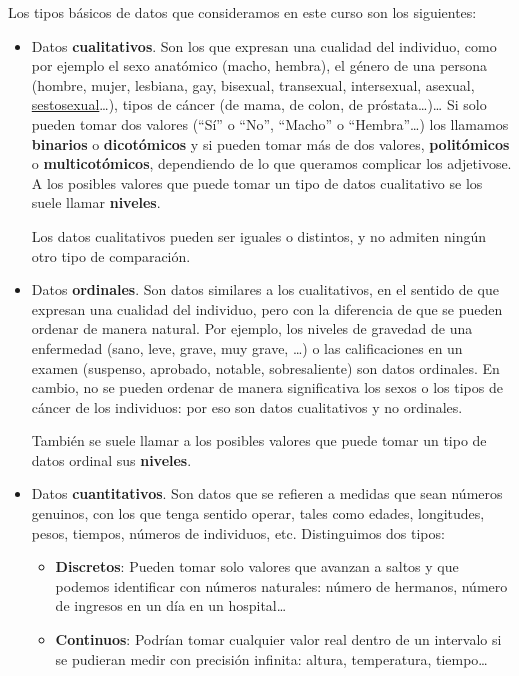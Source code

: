 \documentclass[
]{book}
\theoremstyle{definition}
\theoremstyle{definition}
\theoremstyle{definition}
\theoremstyle{definition}
\theoremstyle{remark}
\begin{document}
Los tipos básicos de datos que consideramos en este curso son los siguientes:

\begin{itemize}
\item
  Datos \textbf{cualitativos}. Son los que expresan una cualidad del individuo, como por ejemplo el sexo anatómico (macho, hembra), el género de una persona (hombre, mujer, lesbiana, gay, bisexual, transexual, intersexual, asexual, \href{https://twitter.com/GEldeanita/status/1297826424309649408}{sestosexual}\ldots), tipos de cáncer (de mama, de colon, de próstata\ldots)\ldots{}
  Si solo pueden tomar dos valores (``Sí'' o ``No'', ``Macho'' o ``Hembra''\ldots) los llamamos \textbf{binarios} o \textbf{dicotómicos} y si pueden tomar más de dos valores, \textbf{politómicos} o \textbf{multicotómicos}, dependiendo de lo que queramos complicar los adjetivose. A los posibles valores que puede tomar un tipo de datos cualitativo se los suele llamar \textbf{niveles}.

  Los datos cualitativos pueden ser iguales o distintos, y no admiten ningún otro tipo de comparación.
\item
  Datos \textbf{ordinales}. Son datos similares a los cualitativos, en el sentido de que expresan una cualidad del individuo, pero con la diferencia de que se pueden ordenar de manera natural. Por ejemplo, los niveles de gravedad de una enfermedad (sano, leve, grave, muy grave, \ldots) o las calificaciones en un examen (suspenso, aprobado, notable, sobresaliente) son datos ordinales. En cambio, no se pueden ordenar de manera significativa los sexos o los tipos de cáncer de los individuos: por eso son datos cualitativos y no ordinales.

  También se suele llamar a los posibles valores que puede tomar un tipo de datos ordinal sus \textbf{niveles}.
\item
  Datos \textbf{cuantitativos}. Son datos que se refieren a medidas que sean números genuinos, con los que tenga sentido operar, tales como edades, longitudes, pesos, tiempos, números de individuos, etc. Distinguimos dos tipos:

  \begin{itemize}
  \item
    \textbf{Discretos}: Pueden tomar solo valores que avanzan a saltos y que podemos identificar con números naturales: número de hermanos, número de ingresos en un día en un hospital\ldots{}
  \item
    \textbf{Continuos}: Podrían tomar cualquier valor real dentro de un intervalo si se pudieran medir con precisión infinita: altura, temperatura, tiempo\ldots{}
  \end{itemize}
\end{itemize}
\end{document}
